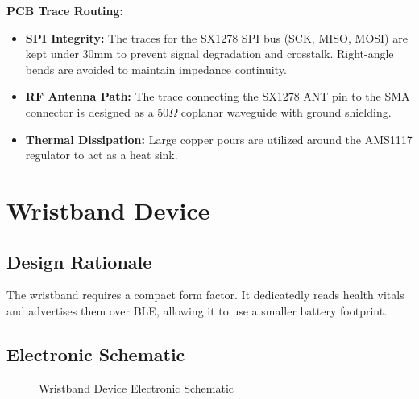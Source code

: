 \textbf{PCB Trace Routing:}
\begin{itemize}
    \item \textbf{SPI Integrity:} The traces for the SX1278 SPI bus (SCK, MISO, MOSI) are kept under 30mm to prevent signal degradation and crosstalk. Right-angle bends are avoided to maintain impedance continuity.
    \item \textbf{RF Antenna Path:} The trace connecting the SX1278 ANT pin to the SMA connector is designed as a 50$\Omega$ coplanar waveguide with ground shielding.
    \item \textbf{Thermal Dissipation:} Large copper pours are utilized around the AMS1117 regulator to act as a heat sink.
\end{itemize}

\section{Wristband Device}
\subsection{Design Rationale}
The wristband requires a compact form factor. It dedicatedly reads health vitals and advertises them over BLE, allowing it to use a smaller battery footprint.

\subsection{Electronic Schematic}

\begin{figure}[htbp]
    \centering
    \caption{Wristband Device Electronic Schematic}
    \label{fig:wristband-schematic}
\end{figure}

